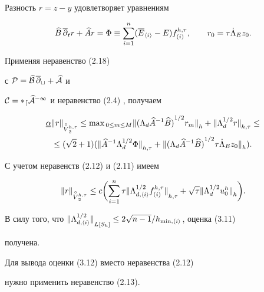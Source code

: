 \begin{pf} Разность $r=z-y$ удовлетворяет уравнениям 


$$


\bbb\,\overline{\partial}_t r+\aaa r=\Phi\equiv \sum_{i=1}^n


(\overline E_{\langle i \rangle}-E)f_{(i)}^{h,\tau},


\qquad r_0=\tau{\Dot\Lambda}_Ez_0.


$$


Применяя  неравенство (2.18) 


с $\cal P=\widehat B\,\overline\partial_t+\widehat A$ и


$\cal C=\Lambda_d\widehat A^{-1}$ и неравенство (2.4) , получаем


\begin{gather*}


\underline\alpha{\ver r\ver}_{\overset{\circ}{V}{}_2^{h,\tau}}\le 


{\ma{(\Lambda_d\aaa^{-1}\bbb)}^{1/2}r_m\ver}_h+{\ver\Lambda_d^{1/2}r


\ver}_{h,\tau}\le \\


\le (\sqrt 2+1)


({\ver\aaa^{-1}\Lambda_d^{1/2}\Phi\ver}_{h,\tau}+


{\ver{(\Lambda_d\aaa^{-1}\bbb)}^{1/2}\tau\Dot\Lambda_Ez_0\ver}_h).


\end{gather*}


С учетом неравенств (2.12) и (2.11) имеем


$$


{\ver r \ver}_{\overset{\circ}{V}{}_2^{h,\tau}}\le c


\biggl(\sum_{i=1}^n\tau{\ver \Lambda_{d,\langle i\rangle}^{1/2}f_{(i)}^{h,\tau}


\ver}_{h,\tau}+\sqrt\tau{\ver\Lambda_d^{1/2}u_0^h\ver}_h\biggr).


$$


В силу того, что ${\ver\Lambda_{d,\langle i\rangle}^{1/2}\ver}_{L[S_h]}\le


2\sqrt{n-1}/h_{\min,\langle i\rangle}$, оценка (3.11)


получена.





Для вывода оценки (3.12)  вместо неравенства (2.12)


нужно применить неравенство (2.13).


\end{pf}





